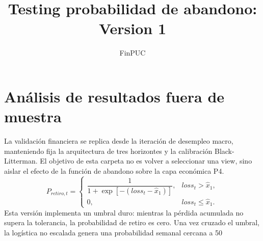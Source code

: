 \documentclass[11pt]{article}
\title{Testing probabilidad de abandono: Version 1}
\author{FinPUC}
\date{}
\begin{document}
\maketitle
\section{Análisis de resultados fuera de muestra}
La validación financiera se replica desde la iteración de desempleo macro, manteniendo fija la arquitectura de tres horizontes y la calibración Black-Litterman. El objetivo de esta carpeta no es volver a seleccionar una view, sino aislar el efecto de la función de abandono sobre la capa económica P4.
\[
P_{retiro,t}=
\begin{cases}
\dfrac{1}{1+\exp[-(loss_t-\hat{x}_1)]}, & loss_t>\hat{x}_1,\\
0, & loss_t\leq \hat{x}_1.
\end{cases}
\]
Esta versión implementa un umbral duro: mientras la pérdida acumulada no supera la tolerancia, la probabilidad de retiro es cero. Una vez cruzado el umbral, la logística no escalada genera una probabilidad semanal cercana a 50%
\begin{table}[H]
\centering
{}
\caption{Comparación financiera fuera de muestra para Version 1.}
\label{tab:version_1:oos}
\end{table}
\end{document}
